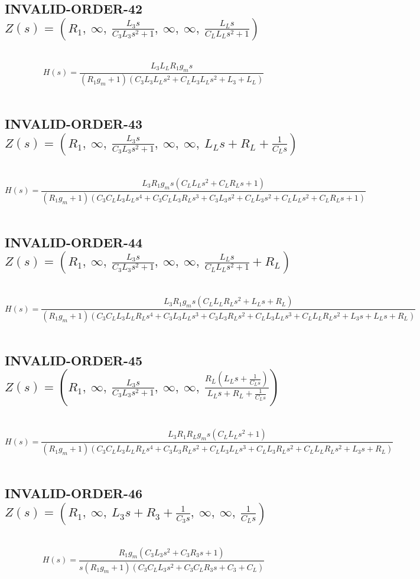 \documentclass{article}
\begin{document}
\subsection{INVALID-ORDER-42 $Z(s) = \left( R_{1}, \  \infty, \  \frac{L_{3} s}{C_{3} L_{3} s^{2} + 1}, \  \infty, \  \infty, \  \frac{L_{L} s}{C_{L} L_{L} s^{2} + 1}\right)$ } \ 
\textbf{\[H(s) = \frac{L_{3} L_{L} R_{1} g_{m} s}{\left(R_{1} g_{m} + 1\right) \left(C_{3} L_{3} L_{L} s^{2} + C_{L} L_{3} L_{L} s^{2} + L_{3} + L_{L}\right)}\] } \ 
\subsection{INVALID-ORDER-43 $Z(s) = \left( R_{1}, \  \infty, \  \frac{L_{3} s}{C_{3} L_{3} s^{2} + 1}, \  \infty, \  \infty, \  L_{L} s + R_{L} + \frac{1}{C_{L} s}\right)$ } \ 
\textbf{\[H(s) = \frac{L_{3} R_{1} g_{m} s \left(C_{L} L_{L} s^{2} + C_{L} R_{L} s + 1\right)}{\left(R_{1} g_{m} + 1\right) \left(C_{3} C_{L} L_{3} L_{L} s^{4} + C_{3} C_{L} L_{3} R_{L} s^{3} + C_{3} L_{3} s^{2} + C_{L} L_{3} s^{2} + C_{L} L_{L} s^{2} + C_{L} R_{L} s + 1\right)}\] } \ 
\subsection{INVALID-ORDER-44 $Z(s) = \left( R_{1}, \  \infty, \  \frac{L_{3} s}{C_{3} L_{3} s^{2} + 1}, \  \infty, \  \infty, \  \frac{L_{L} s}{C_{L} L_{L} s^{2} + 1} + R_{L}\right)$ } \ 
\textbf{\[H(s) = \frac{L_{3} R_{1} g_{m} s \left(C_{L} L_{L} R_{L} s^{2} + L_{L} s + R_{L}\right)}{\left(R_{1} g_{m} + 1\right) \left(C_{3} C_{L} L_{3} L_{L} R_{L} s^{4} + C_{3} L_{3} L_{L} s^{3} + C_{3} L_{3} R_{L} s^{2} + C_{L} L_{3} L_{L} s^{3} + C_{L} L_{L} R_{L} s^{2} + L_{3} s + L_{L} s + R_{L}\right)}\] } \ 
\subsection{INVALID-ORDER-45 $Z(s) = \left( R_{1}, \  \infty, \  \frac{L_{3} s}{C_{3} L_{3} s^{2} + 1}, \  \infty, \  \infty, \  \frac{R_{L} \left(L_{L} s + \frac{1}{C_{L} s}\right)}{L_{L} s + R_{L} + \frac{1}{C_{L} s}}\right)$ } \ 
\textbf{\[H(s) = \frac{L_{3} R_{1} R_{L} g_{m} s \left(C_{L} L_{L} s^{2} + 1\right)}{\left(R_{1} g_{m} + 1\right) \left(C_{3} C_{L} L_{3} L_{L} R_{L} s^{4} + C_{3} L_{3} R_{L} s^{2} + C_{L} L_{3} L_{L} s^{3} + C_{L} L_{3} R_{L} s^{2} + C_{L} L_{L} R_{L} s^{2} + L_{3} s + R_{L}\right)}\] } \ 
\subsection{INVALID-ORDER-46 $Z(s) = \left( R_{1}, \  \infty, \  L_{3} s + R_{3} + \frac{1}{C_{3} s}, \  \infty, \  \infty, \  \frac{1}{C_{L} s}\right)$ } \ 
\textbf{\[H(s) = \frac{R_{1} g_{m} \left(C_{3} L_{3} s^{2} + C_{3} R_{3} s + 1\right)}{s \left(R_{1} g_{m} + 1\right) \left(C_{3} C_{L} L_{3} s^{2} + C_{3} C_{L} R_{3} s + C_{3} + C_{L}\right)}\] } \ 
\end{document}

